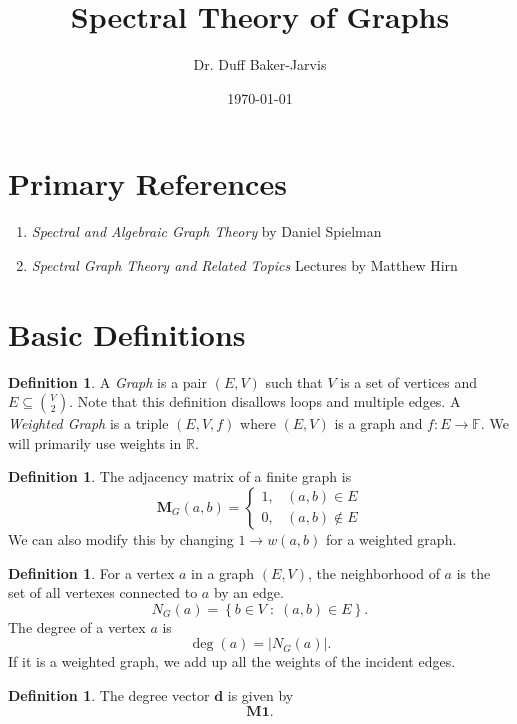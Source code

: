 \documentclass[12pt]{article}
\theoremstyle{definition}
\newtheorem{defn}[thm]{Definition}
\def\R{{\mathbb R}}
\newcommand{\F}{\mathbb{F}}
\DeclareMathOperator{\dg}{deg}
\begin{document}
\title{Spectral Theory of Graphs}
\date{\today}
\author{Dr. Duff Baker-Jarvis}
\maketitle

\section*{Primary References}
\begin{enumerate}
    \item \textit{Spectral and Algebraic Graph Theory} by Daniel Spielman
    \item \textit{Spectral Graph Theory and Related Topics} Lectures by Matthew Hirn
\end{enumerate}


\section*{Basic Definitions}
\begin{defn}
    A \textit{Graph} is a pair $ (E,V) $ such that $ V $ is a set of vertices and $ E\subseteq \binom{V}{2}$. Note that this definition disallows loops and multiple edges.
    A \textit{Weighted Graph} is a triple $ (E,V, f) $ where $ (E,V) $ is a graph and $ f:E\to \F $. We will primarily use weights in $ \R $.
\end{defn}

\begin{defn}
The adjacency matrix of a finite graph is 
$$ \mathbf{M}_G(a,b)= \begin{cases}
    1, & (a,b)\in E\\
    0, & (a,b)\not\in E
\end{cases}
 $$
 We can also modify this by changing $ 1\to w(a,b) $ for a weighted graph.
\end{defn}

\begin{defn}
For a vertex $ a $ in a graph $ (E,V) $, the neighborhood of $ a $ is the set of all vertexes connected to $ a $ by an edge.
$$ N_G(a)=\left\{b\in V\; :\; (a,b)\in E\right\}. $$ 
The degree of a vertex $ a $ is 
$$ \dg(a) = |N_G(a)|. $$ 
If it is a weighted graph, we add up all the weights of the incident edges.
\end{defn}

\begin{defn}
The degree vector $ \mathbf{d} $ is given by
$$ \mathbf{M} \mathbf{1}.$$ 
\end{defn}
\end{document}
